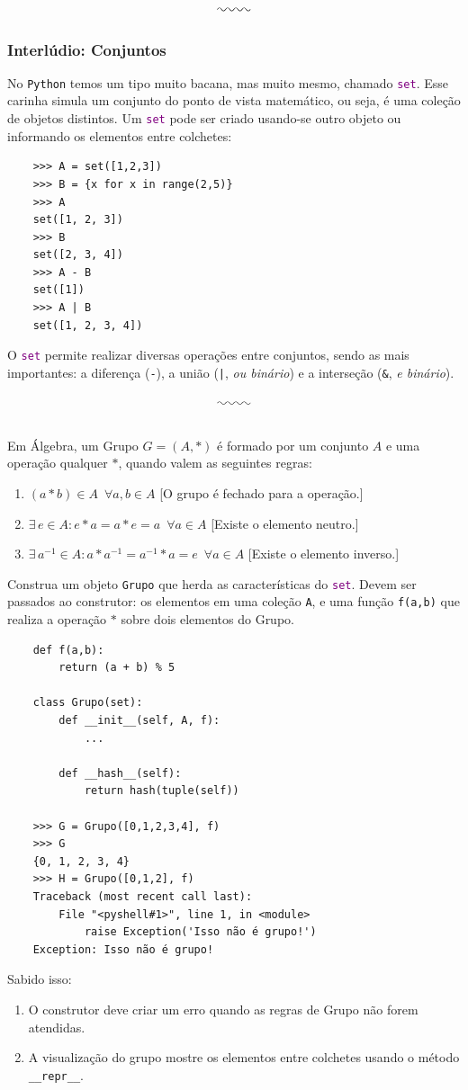 \documentclass[12pt]{article}
\newcommand{\mono}[1]{\texttt{#1}}
\newcommand{\type}[1]{\textcolor{purple}{\mono{#1}}}
\newcommand{\spm}[1]{\mono{\_\_#1\_\_}}
\begin{document}
	\[\photon\]
	
	\subsubsection{Interlúdio: Conjuntos}
	No \mono{Python} temos um tipo muito bacana, mas muito mesmo, chamado \type{set}. Esse carinha simula um conjunto do ponto de vista matemático, ou seja, é uma coleção de objetos distintos. Um \type{set} pode ser criado usando-se outro objeto ou informando os elementos entre colchetes:
	
	\begin{verbatim}
	>>> A = set([1,2,3])
	>>> B = {x for x in range(2,5)}
	>>> A
	set([1, 2, 3])
	>>> B
	set([2, 3, 4])
	>>> A - B
	set([1])
	>>> A | B
	set([1, 2, 3, 4])
	\end{verbatim}
	
	O \type{set} permite realizar diversas operações entre conjuntos, sendo as mais importantes: a diferença (\mono{-}), a união (\mono{|}, \emph{ou binário}) e a interseção (\mono{\&}, \emph{e binário}). 
	
	\[\photon\]\\
	
	Em Álgebra, um Grupo $G = (A, \ast)$ é formado por um conjunto $A$ e uma operação qualquer $\ast$, quando valem as seguintes regras:
	
	\begin{enumerate}
		\item $(a \ast b) \in A \,\,\, \forall a,b \in A$ [O grupo é fechado para a operação.]
		\item $\exists \, e \in A : e \ast a = a \ast e = a \,\,\, \forall a \in A$ [Existe o elemento neutro.]
		\item $\exists \, a^{-1} \in A : a \ast a^{-1} = a^{-1} \ast a = e \,\,\, \forall a \in A$ [Existe o elemento inverso.]\\
	\end{enumerate}
	Construa um objeto \mono{Grupo} que herda as características do \type{set}. Devem ser passados ao construtor: os elementos em uma coleção \mono{A}, e uma função \mono{f(a,b)} que realiza a operação $\ast$ sobre dois elementos do Grupo.
	
	\begin{verbatim}
	def f(a,b):
	    return (a + b) % 5
	    
	class Grupo(set):
	    def __init__(self, A, f):
	        ...

	    def __hash__(self):
	        return hash(tuple(self))
	        
	>>> G = Grupo([0,1,2,3,4], f)
	>>> G
	{0, 1, 2, 3, 4}
	>>> H = Grupo([0,1,2], f)
	Traceback (most recent call last):
	    File "<pyshell#1>", line 1, in <module>
	        raise Exception('Isso não é grupo!')
	Exception: Isso não é grupo!
	\end{verbatim}
	Sabido isso:
	\begin{enumerate}
		\item O construtor deve criar um erro quando as regras de Grupo não forem atendidas.
		\item A visualização do grupo mostre os elementos entre colchetes usando o método \spm{repr}.
	\end{enumerate}
\end{document}
